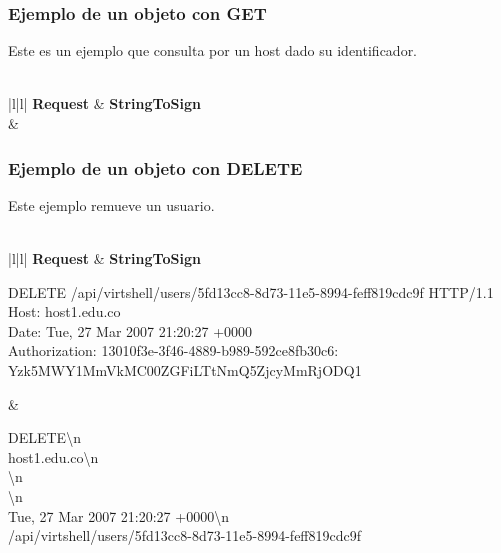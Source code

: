 \subsubsection{Ejemplo de un objeto con GET}

Este es un ejemplo que consulta por un host dado su identificador. \\
\\
\vspace{1cm}
\scriptsize
\begin{tabular}{|l|l|} \hline
\textbf{Request} & \textbf{StringToSign} \\ \hline
{} & 
 \tabularnewline \hline
\end{tabular}
\normalsize

\subsubsection{Ejemplo de un objeto con DELETE}

Este ejemplo remueve un usuario.\\
\\
\vspace{1cm}
\scriptsize
\begin{tabular}{|l|l|} \hline
\textbf{Request} & \textbf{StringToSign} \\ \hline
{}%
{\raggedright DELETE /api/virtshell/users/5fd13cc8-8d73-11e5-8994-feff819cdc9f HTTP/1.1 \\
 Host: host1.edu.co \\
 Date: Tue, 27 Mar 2007 21:20:27 +0000 \\
 Authorization: 13010f3e-3f46-4889-b989-592ce8fb30c6: Yzk5MWY1MmVkMC00ZGFiLTtNmQ5ZjcyMmRjODQ1 } & %
{\raggedright DELETE\textbackslash{}n \\
 host1.edu.co\textbackslash{}n \\
 \textbackslash{}n \\
 \textbackslash{}n \\
 Tue, 27 Mar 2007 21:20:27 +0000\textbackslash{}n \\ /api/virtshell/users/5fd13cc8-8d73-11e5-8994-feff819cdc9f} \tabularnewline \hline
\end{tabular}

